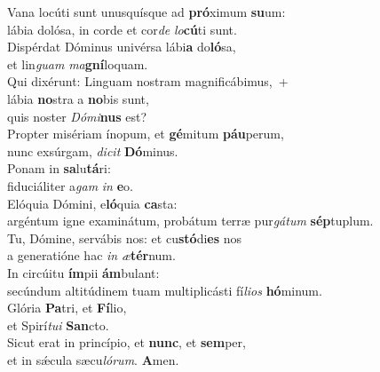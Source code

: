 \evenverse Vana locúti sunt unusquísque ad \textbf{pró}ximum \textbf{su}um:~\*\\
\evenverse lábia dolósa, in corde et cor\textit{de} \textit{lo}\textbf{cú}ti sunt.\\
\oddverse Dispérdat Dóminus univérsa lábi\textbf{a} do\textbf{ló}sa,~\*\\
\oddverse et lin\textit{guam} \textit{ma}\textbf{gní}loquam.\\
\evenverse Qui dixérunt: Linguam nostram magnificábimus,~+\\
\evenverse  lábia \textbf{no}stra a \textbf{no}bis sunt,~\*\\
\evenverse quis noster \textit{Dó}\textit{mi}\textbf{nus} est?\\
\oddverse Propter misériam ínopum, et \textbf{gé}mitum \textbf{páu}perum,~\*\\
\oddverse nunc exsúrgam, \textit{di}\textit{cit} \textbf{Dó}minus.\\
\evenverse Ponam in \textbf{sa}lu\textbf{tá}ri:~\*\\
\evenverse fiduciáliter a\textit{gam} \textit{in} \textbf{e}o.\\
\oddverse Elóquia Dómini, e\textbf{ló}quia \textbf{ca}sta:~\*\\
\oddverse argéntum igne examinátum, probátum terræ pur\textit{gá}\textit{tum} \textbf{sép}tuplum.\\
\evenverse Tu, Dómine, servábis nos: et cu\textbf{stó}di\textbf{es} nos~\*\\
\evenverse a generatióne hac \textit{in} \textit{æ}\textbf{tér}num.\\
\oddverse In circúitu \textbf{ím}pii \textbf{ám}bulant:~\*\\
\oddverse secúndum altitúdinem tuam multiplicásti fí\textit{li}\textit{os} \textbf{hó}minum.\\
\evenverse Glória \textbf{Pa}tri, et \textbf{Fí}lio,~\*\\
\evenverse et Spirí\textit{tu}\textit{i} \textbf{San}cto.\\
\oddverse Sicut erat in princípio, et \textbf{nunc}, et \textbf{sem}per,~\*\\
\oddverse et in sǽcula sæcu\textit{ló}\textit{rum}. \textbf{A}men.\\
